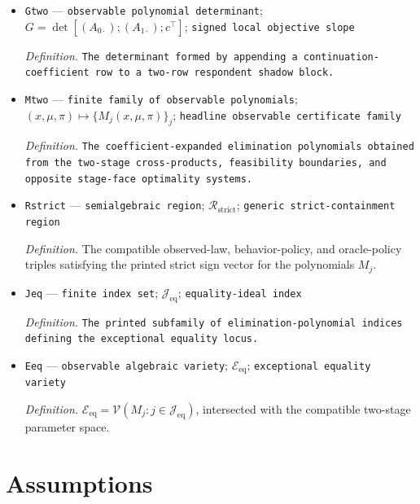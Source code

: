 \documentclass{article}
\begin{document}
\begin{itemize}
  \par\smallskip\noindent\emph{Definition.} \texttt{The three reward-\allowbreak{}coordinate coefficients obtained after substituting the exact two-\allowbreak{}stage behavior and oracle-\allowbreak{}policy weights into a continuation-\allowbreak{}value objective.}
  \item \texttt{Gtwo} --- \texttt{observable polynomial determinant}; \(G=\det[(A_{0\cdot});(A_{1\cdot});c^\top]\); \texttt{signed local objective slope}
  \par\smallskip\noindent\emph{Definition.} \texttt{The determinant formed by appending a continuation-\allowbreak{}coefficient row to a two-\allowbreak{}row respondent shadow block.}
  \item \texttt{Mtwo} --- \texttt{finite family of observable polynomials}; \((x,\mu,\pi)\mapsto\{M_j(x,\mu,\pi)\}_j\); \texttt{headline observable certificate family}
  \par\smallskip\noindent\emph{Definition.} \texttt{The coefficient-\allowbreak{}expanded elimination polynomials obtained from the two-\allowbreak{}stage cross-\allowbreak{}products,\allowbreak{} feasibility boundaries,\allowbreak{} and opposite stage-\allowbreak{}face optimality systems.}
  \item \texttt{Rstrict} --- \texttt{semialgebraic region}; \(\mathcal R_{\mathrm{strict}}\); \texttt{generic strict-\allowbreak{}containment region}
  \par\smallskip\noindent\emph{Definition.} The compatible observed-law, behavior-policy, and oracle-policy triples satisfying the printed strict sign vector for the polynomials \(M_j\).
  \item \texttt{Jeq} --- \texttt{finite index set}; \(\mathcal J_{\mathrm{eq}}\); \texttt{equality-\allowbreak{}ideal index}
  \par\smallskip\noindent\emph{Definition.} \texttt{The printed subfamily of elimination-\allowbreak{}polynomial indices defining the exceptional equality locus.}
  \item \texttt{Eeq} --- \texttt{observable algebraic variety}; \(\mathcal E_{\mathrm{eq}}\); \texttt{exceptional equality variety}
  \par\smallskip\noindent\emph{Definition.} \(\mathcal E_{\mathrm{eq}}=\mathcal V(M_j:j\in\mathcal J_{\mathrm{eq}})\), intersected with the compatible two-stage parameter space.
\end{itemize}

\section{Assumptions}
\end{document}

